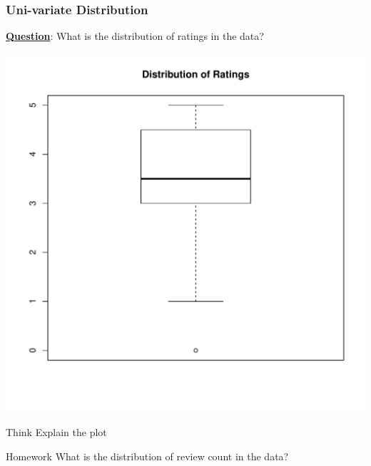 \newpage
\subsubsection{Uni-variate Distribution}
\noindent \textbf{\underline{Question}}: What is the distribution of ratings in the data?
\begin{knitrout}
\color{fgcolor}\begin{kframe}
\begin{alltt}
\hlopt{$} \hlstd{=} \hlstd{)}
\end{alltt}
\end{kframe}
\includegraphics[width=\maxwidth]{figure/boxplotStars-1} 

\end{knitrout}

\begin{DIY}{Think}
\noindent Explain the plot
\end{DIY}

\begin{DIY}{Homework}
\noindent What is the distribution of review count in the data?
\end{DIY}

\newpage
